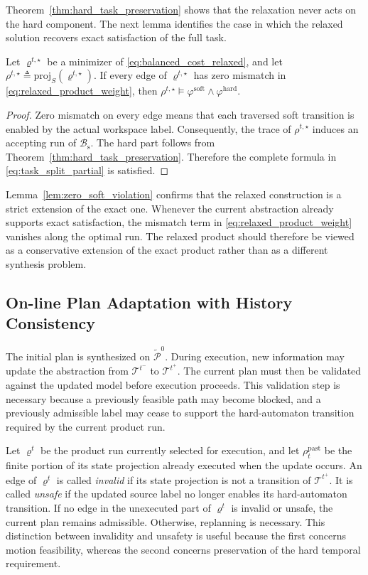 Theorem~\ref{thm:hard_task_preservation} shows that the relaxation never acts
on the hard component. The next lemma identifies the case in which the relaxed
solution recovers exact satisfaction of the full task.

\begin{lemma}
\label{lem:zero_soft_violation}
Let $\varrho^{t,\star}$ be a minimizer of
\eqref{eq:balanced_cost_relaxed}, and let
$\rho^{t,\star} \triangleq \mathrm{proj}_{S}(\varrho^{t,\star})$.
If every edge of $\varrho^{t,\star}$ has zero mismatch in
\eqref{eq:relaxed_product_weight}, then
$\rho^{t,\star} \models
\varphi^{\mathrm{soft}} \wedge \varphi^{\mathrm{hard}}$.
\end{lemma}

\begin{proof}
Zero mismatch on every edge means that each traversed soft transition is enabled
by the actual workspace label. Consequently, the trace of $\rho^{t,\star}$
induces an accepting run of $\mathcal{B}_{\mathrm{s}}$. The hard part follows
from Theorem~\ref{thm:hard_task_preservation}. Therefore the complete formula in
\eqref{eq:task_split_partial} is satisfied.
\end{proof}

Lemma~\ref{lem:zero_soft_violation} confirms that the relaxed construction is a
strict extension of the exact one. Whenever the current abstraction already
supports exact satisfaction, the mismatch term in
\eqref{eq:relaxed_product_weight} vanishes along the optimal run. The relaxed
product should therefore be viewed as a conservative extension of the exact
product rather than as a different synthesis problem.

\subsection{On-line Plan Adaptation with History Consistency}
\label{subsec:online_update_and_revision}

The initial plan is synthesized on $\widetilde{\mathcal{P}}^{0}$. During
execution, new information may update the abstraction from
$\mathcal{T}^{t^-}$ to $\mathcal{T}^{t^+}$. The current plan must then be
validated against the updated model before execution proceeds. This validation
step is necessary because a previously feasible path may become blocked, and a
previously admissible label may cease to support the hard-automaton transition
required by the current product run.

Let $\varrho^{t}$ be the product run currently selected for execution, and let
$\rho^{\mathrm{past}}_{t}$ be the finite portion of its state projection already
executed when the update occurs. An edge of $\varrho^{t}$ is called
\emph{invalid} if its state projection is not a transition of
$\mathcal{T}^{t^+}$. It is called \emph{unsafe} if the updated source label no
longer enables its hard-automaton transition. If no edge in the unexecuted part
of $\varrho^{t}$ is invalid or unsafe, the current plan remains admissible.
Otherwise, replanning is necessary. This distinction between invalidity and
unsafety is useful because the first concerns motion feasibility, whereas the
second concerns preservation of the hard temporal requirement.

